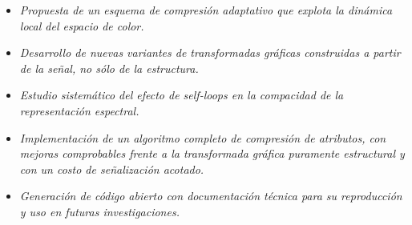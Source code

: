 \begin{itemize}
    \item \textit{Propuesta de un esquema de compresión adaptativo que explota la dinámica local del espacio de color.}
    \item \textit{Desarrollo de nuevas variantes de transformadas gráficas construidas a partir de la señal, no sólo de la estructura.}
    \item \textit{Estudio sistemático del efecto de self-loops en la compacidad de la representación espectral.}
    \item \textit{Implementación de un algoritmo completo de compresión de atributos, con mejoras comprobables frente a la transformada gráfica puramente estructural y con un costo de señalización acotado.}
    \item \textit{Generación de código abierto con documentación técnica para su reproducción y uso en futuras investigaciones.}
\end{itemize}
